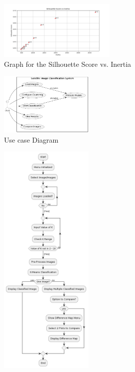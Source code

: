 \begin{figure}[ht]
\centering
\includegraphics[width=0.5\textwidth]{Pictures/Silhouette score vs Inertia}
\caption{Graph for the Silhouette Score vs. Inertia}
\label{fig:3}
\end{figure}

\begin{figure}[ht]
\centering
\includegraphics[width=0.4\textwidth]{Pictures/Use case Diagram}
\caption{Use case Diagram}
\label{fig:5}
\end{figure}

\begin{figure}[ht]
\centering
\includegraphics[width=0.4\textwidth]{Pictures/Program Flowchart}
\caption{}
\label{fig:6}
\end{figure}


